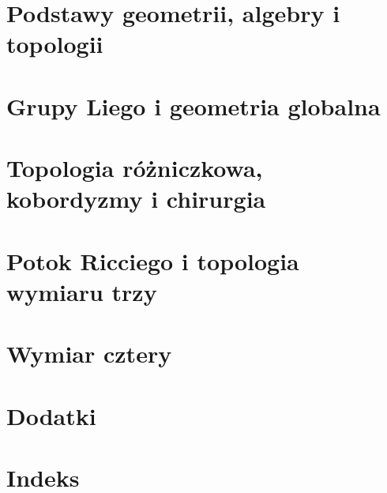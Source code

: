 \documentclass[11pt,a4paper]{report}
\begin{document}


\part{Podstawy geometrii, algebry i topologii}















\part{Grupy Liego i geometria globalna}





\part{Topologia różniczkowa, kobordyzmy i chirurgia}













\part{Potok Ricciego i topologia wymiaru trzy}




\part{Wymiar cztery}






\part{Dodatki}
\appendix




\part{Indeks}

\end{document}
